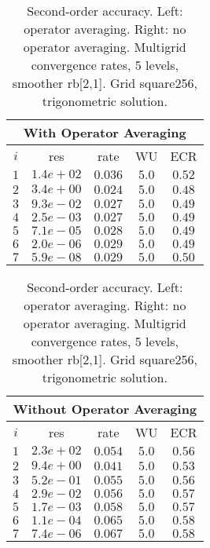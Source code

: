 \documentclass[11pt]{article}
\begin{document}
\begin{table}[hbt]
\begin{center}
\begin{tabular}{|c|c|c|c|c|} \hline 
 \multicolumn{5}{|c|}{With Operator Averaging}\\   \hline 
 $i$   & res      & rate    &  WU    & ECR  \\   \hline 
 $ 1$  & $ 1.4e+02$ & $0.036$ & $ 5.0$ & $0.52$ \\ 
 $ 2$  & $ 3.4e+00$ & $0.024$ & $ 5.0$ & $0.48$ \\ 
 $ 3$  & $ 9.3e-02$ & $0.027$ & $ 5.0$ & $0.49$ \\ 
 $ 4$  & $ 2.5e-03$ & $0.027$ & $ 5.0$ & $0.49$ \\ 
 $ 5$  & $ 7.1e-05$ & $0.028$ & $ 5.0$ & $0.49$ \\ 
 $ 6$  & $ 2.0e-06$ & $0.029$ & $ 5.0$ & $0.49$ \\ 
 $ 7$  & $ 5.9e-08$ & $0.029$ & $ 5.0$ & $0.50$ \\ 
\hline 
\end{tabular} \qquad
\begin{tabular}{|c|c|c|c|c|} \hline 
 \multicolumn{5}{|c|}{Without Operator Averaging}\\   \hline 
 $i$   & res      & rate    &  WU    & ECR  \\   \hline 
 $ 1$  & $ 2.3e+02$ & $0.054$ & $ 5.0$ & $0.56$ \\ 
 $ 2$  & $ 9.4e+00$ & $0.041$ & $ 5.0$ & $0.53$ \\ 
 $ 3$  & $ 5.2e-01$ & $0.055$ & $ 5.0$ & $0.56$ \\ 
 $ 4$  & $ 2.9e-02$ & $0.056$ & $ 5.0$ & $0.57$ \\ 
 $ 5$  & $ 1.7e-03$ & $0.058$ & $ 5.0$ & $0.57$ \\ 
 $ 6$  & $ 1.1e-04$ & $0.065$ & $ 5.0$ & $0.58$ \\ 
 $ 7$  & $ 7.4e-06$ & $0.067$ & $ 5.0$ & $0.58$ \\ 
\hline 
\end{tabular}\\
\end{center}
\caption{Second-order accuracy. Left: operator averaging. Right: no operator averaging. Multigrid convergence rates, 5 levels, smoother rb[2,1]. Grid square256, trigonometric solution.}
\label{tab:operatorAveraging} 
\end{table}
\end{document}
